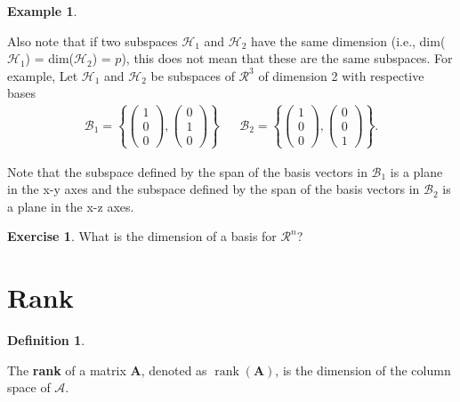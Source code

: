 \documentclass[
]{book}
\theoremstyle{definition}
\newtheorem{definition}{Definition}[chapter]
\theoremstyle{definition}
\newtheorem{example}{Example}[chapter]
\theoremstyle{definition}
\newtheorem{exercise}{Exercise}[chapter]
\theoremstyle{remark}
\begin{document}
\begin{example}
\protect\hypertarget{exm:unlabeled-div-97}{}\label{exm:unlabeled-div-97}

Also note that if two subspaces \(\mathcal{H}_1\) and \(\mathcal{H}_2\) have the same dimension (i.e., dim(\(\mathcal{H}_1\)) = dim(\(\mathcal{H}_2\)) = \(p\)), this does not mean that these are the same subspaces. For example, Let \(\mathcal{H}_1\) and \(\mathcal{H}_2\) be subspaces of \(\mathcal{R}^3\) of dimension 2 with respective bases
\[
\begin{aligned}
\mathcal{B}_1 = \left\{ \begin{pmatrix} 1 \\ 0 \\ 0 \end{pmatrix}, \begin{pmatrix} 0 \\ 1 \\ 0 \end{pmatrix} \right\} && \mathcal{B}_2 = \left\{ \begin{pmatrix} 1 \\ 0 \\ 0 \end{pmatrix}, \begin{pmatrix} 0 \\ 0 \\ 1 \end{pmatrix} \right\}. 
\end{aligned}
\]

Note that the subspace defined by the span of the basis vectors in \(\mathcal{B}_1\) is a plane in the x-y axes and the subspace defined by the span of the basis vectors in \(\mathcal{B}_2\) is a plane in the x-z axes.

\end{example}

\begin{exercise}
\protect\hypertarget{exr:unnamed-chunk-195}{}{\label{exr:unnamed-chunk-195} }What is the dimension of a basis for \(\mathcal{R}^n\)?
\end{exercise}

\hypertarget{rank}{%
\section{Rank}\label{rank}}

\begin{definition}
\protect\hypertarget{def:rank}{}\label{def:rank}

The \textbf{rank} of a matrix \(\mathbf{A}\), denoted as \(\operatorname{rank}(\mathbf{A})\), is the dimension of the column space of \(\mathcal{A}\).

\end{definition}
\end{document}
